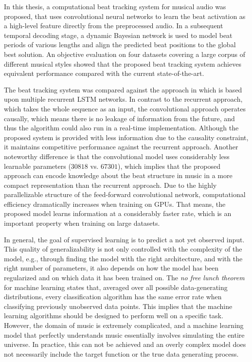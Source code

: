 \documentclass{scrartcl}
\begin{document}
In this thesis, a computational beat tracking system for musical audio was proposed, that uses convolutional neural networks to learn the beat activation as a high-level feature directly from the preprocessed audio. In a subsequent temporal decoding stage, a dynamic Bayesian network is used to model beat periods of various lengths and align the predicted beat positions to the global best solution. An objective evaluation on four datasets covering a large corpus of different musical styles showed that the proposed beat tracking system achieves equivalent performance compared with the current state-of-the-art.


The beat tracking system was compared against the approach in \cite{Boeck2014} which is based upon multiple recurrent LSTM networks. In contrast to the recurrent approach, which takes the whole sequence as an input, the convolutional approach operates causally, which means there is no leakage of information from the future, and thus the algorithm could also run in a real-time implementation. Although the proposed system is provided with less information due to the causality constraint, it maintains competitive performance against the recurrent approach. Another noteworthy difference is that the convolutional model uses considerably less learnable parameters ($\num[group-separator={,}]{30818}$ vs. $\num[group-separator={,}]{67301}$), which implies that the proposed approach can encode knowledge about the beat structure in music in a more compact representation than the recurrent approach. Due to the highly parallelizable structure of the feed-forward convolutional network, computational efficiency dramatically increases when training on GPUs. That means, the proposed model learns information at a considerably faster rate, which is an important property when training on large datasets. 


In general, the goal of supervised learning is to predict a not yet observed input. This quality of generalizability is not only controlled with the complexity of the model, e.g., through finding the model with the right architecture, and with the right number of parameters, it also depends on how the model has been regularized and on which data it has been trained on. The \emph{no free lunch theorem} for machine learning \cite{Wolpert1996} states that, averaged over all possible data-generating distributions, every classification algorithm has the same error rate when classifying previously unobserved data points. This implies that the machine learning algorithms should be designed to perform well on a specific task. However, the domain of music is extremely complicated, and a machine learning model that perfectly understands music essentially involves simulating the entire universe. In practice, this can not be achieved and an overly complex model does not necessarily include the target function or the true data generating process. 
\end{document}
